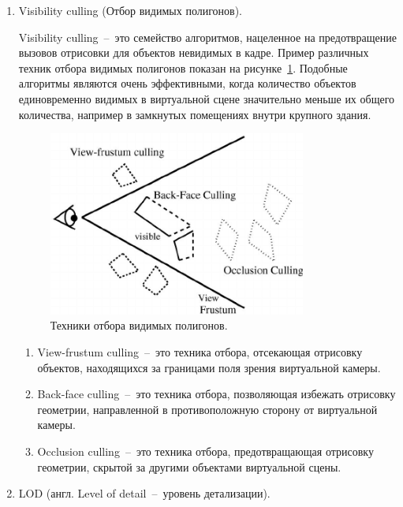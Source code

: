 \begin{enumerate}
    \item {
        Visibility culling (Отбор видимых полигонов).

        Visibility culling~--~это семейство алгоритмов,
        нацеленное на предотвращение вызовов отрисовки
        для объектов невидимых в кадре.%
        \cite{Cohenor2002}
        Пример различных техник отбора видимых полигонов
        показан на рисунке~\ref{figure:CullingTechniques}.
        Подобные алгоритмы являются очень эффективными,
        когда количество объектов единовременно видимых в виртуальной сцене
        значительно меньше их общего количества,
        например в замкнутых помещениях внутри крупного здания.

        \begin{figure}[ht]
            \centering
            \includegraphics[width=0.8\textwidth]
            {images/Three-types-of-visibility-culling-techniques.png}
            \caption{Техники отбора видимых полигонов.%
            \cite{Cohenor2002}}
            \label{figure:CullingTechniques}
        \end{figure}

        \begin{enumerate}
            \item {
                View-frustum culling~--~это техника отбора,
                отсекающая отрисовку объектов,
                находящихся за границами поля зрения виртуальной камеры.
            }
            \item {
                Back-face culling~--~это техника отбора,
                позволяющая избежать отрисовку геометрии,
                направленной в противоположную сторону от виртуальной камеры.
            }
            \item {
                Occlusion culling~--~это техника отбора,
                предотвращающая отрисовку геометрии,
                скрытой за другими объектами виртуальной сцены.
            }
        \end{enumerate}
    }
    \item {
        LOD (англ. Level of detail~--~уровень детализации).

}
\end{enumerate}
